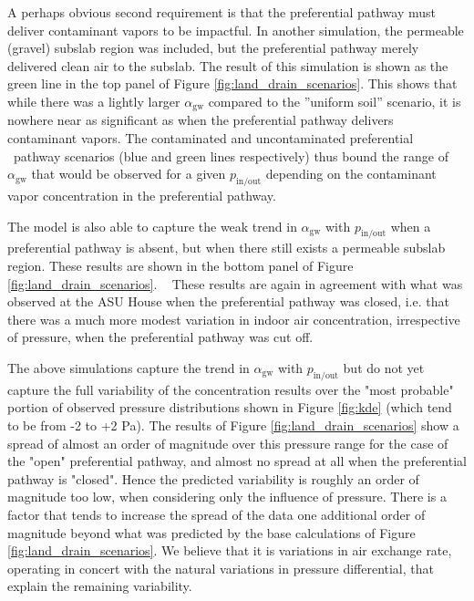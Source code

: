 A perhaps obvious second requirement is that the preferential pathway must deliver contaminant vapors to be impactful.
In another simulation, the permeable (gravel) subslab region was included, but the preferential pathway merely delivered clean air to the subslab.
The result of this simulation is shown as the green line in the top panel of Figure \ref{fig:land_drain_scenarios}.
This shows that while there was a lightly larger $\alpha_\mathrm{gw}$ compared to the ”uniform soil” scenario, it is nowhere near as significant as when the preferential pathway delivers contaminant vapors.
The contaminated and uncontaminated preferential  pathway scenarios (blue and green lines respectively) thus bound the range of $\alpha_\mathrm{gw}$ that would be observed for a given $p_\mathrm{in/out}$ depending on the contaminant vapor concentration in the preferential pathway.\par

The model is also able to capture the weak trend in $\alpha_\mathrm{gw}$ with $p_\mathrm{in/out}$ when a preferential pathway is absent, but when there still exists a permeable subslab region.
These results are shown in the bottom panel of Figure \ref{fig:land_drain_scenarios}.  
These results are again in agreement with what was observed at the ASU House when the preferential pathway was closed, i.e. that there was a much more modest variation in indoor air concentration, irrespective of pressure, when the preferential pathway was cut off.\par

The above simulations capture the trend in $\alpha_\mathrm{gw}$ with $p_\mathrm{in/out}$ but do not yet capture the full variability of the concentration results over the "most probable" portion of observed pressure distributions shown in Figure \ref{fig:kde} (which tend to be from -2 to +2 Pa).
The results of Figure \ref{fig:land_drain_scenarios} show a spread of almost an order of magnitude over this pressure range for the case of the "open" preferential pathway, and almost no spread at all when the preferential pathway is "closed".
Hence the predicted variability is roughly an order of magnitude too low, when considering only the influence of pressure.
There is a factor that tends to increase the spread of the data one additional order of magnitude beyond what was predicted by the base calculations of Figure \ref{fig:land_drain_scenarios}.
We believe that it is variations in air exchange rate, operating in concert with the natural variations in pressure differential, that explain the remaining variability.\par

